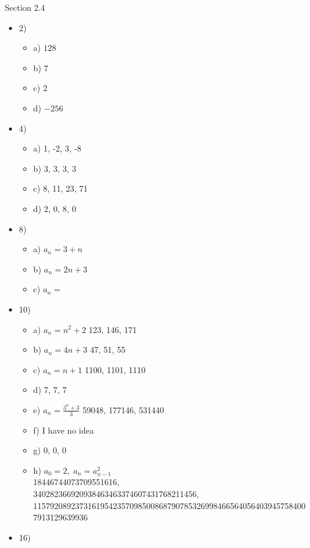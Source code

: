 \documentclass{article}
\begin{document}
	Section 2.4
\begin{itemize}
	\item
		2)
    \begin{itemize}
      \item
        a) $128$
      \item
        b) $7$
      \item
        c) $2$
      \item
        d) $-256$
    \end{itemize}
	\item
		4)
    \begin{itemize}
      \item
        a) 1, -2, 3, -8
      \item
        b) 3, 3, 3, 3
      \item
        c) 8, 11, 23, 71
      \item
        d) 2, 0, 8, 0
    \end{itemize}
	\item
		8)
    \begin{itemize}
      \item
        a) $a_{n}=3+n$
      \item
        b) $a_{n}=2n+3$
      \item
        c) $a_{n}=$
    \end{itemize}
	\item
		10)
    \begin{itemize}
      \item
        a) $a_{n}=n^{2}+2$ 123, 146, 171
      \item
        b) $a_{n}=4n+3$ 47, 51, 55 
      \item
        c) $a_{n}=n+1$ 1100, 1101, 1110 
      \item
        d) 7, 7, 7
      \item
        e) $a_{n}=\frac{3^{n}+3}{3}$ 59048, 177146, 531440
      \item
        f) I have no idea
      \item
        g) 0, 0, 0
      \item
        h) $a_{0} = 2,\; a_{n} = a_{n-1}^{2}$\\
        18446744073709551616,\\ 
        340282366920938463463374607431768211456,\\
        115792089237316195423570985008687907853269984665640564039457584007913129639936
    \end{itemize}
	\item
		16)
    \begin{itemize}

\end{itemize}
\end{itemize}
\end{document}
